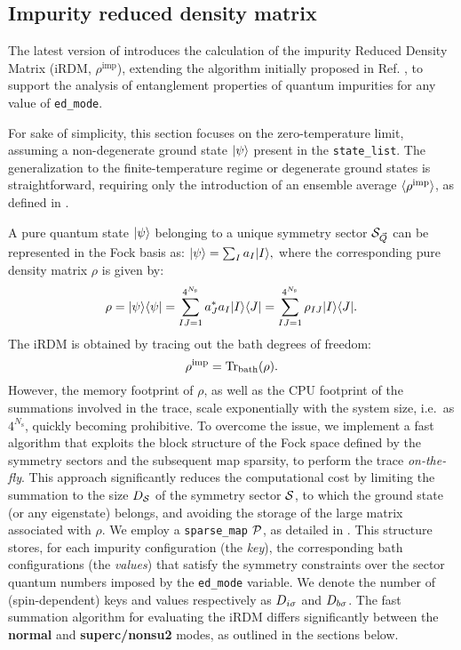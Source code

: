 \documentclass[edipack_sp.tex]{subfiles}
\begin{document}
\subsection{Impurity reduced density matrix}\label{sSecRDM}
The latest version of \NAME introduces the calculation of the 
impurity Reduced Density Matrix (iRDM, $\rho^\mathrm{imp}$), 
extending the algorithm initially proposed in 
Ref. \cite{BellomiaPhD,Bellomia2024PRB}, to support the analysis of entanglement 
properties of quantum impurities for any value of {\tt ed\_mode}.

For sake of simplicity, this section focuses on the zero-temperature limit, 
assuming a non-degenerate ground state $|\psi\rangle$ present in the 
{\tt state\_list}. The generalization to the finite-temperature regime 
or degenerate ground states is straightforward, requiring only the  introduction of an
ensemble average $\langle \rho^\mathrm{imp} \rangle$, as defined in 
.

A pure quantum state $|\psi\rangle$ belonging to a unique symmetry 
sector ${\cal S}_{\vec{Q}}$ can be represented in the Fock basis as:
$
|\psi\rangle = \sum_I a_I |I\rangle,
$
where the corresponding pure density matrix $\rho$ is given by:
\begin{equation}\label{DefRho}
\rho = |\psi\rangle\langle \psi| = \sum_{IJ=1}^{4^{N_\mathrm{s}}} 
a^*_J a_I |I\rangle\langle J| = \sum_{IJ=1}^{4^{N_\mathrm{s}}} 
\rho_{IJ} |I\rangle\langle J|.
\end{equation}
The iRDM is obtained by tracing out the bath degrees of freedom:
\begin{equation}
\rho^\mathrm{imp} = {\rm Tr}_\mathrm{bath}(\rho).
\end{equation}
However, the memory footprint of $\rho$, as well as the CPU footprint 
of the summations involved in the trace, scale exponentially 
with the system size, i.e.~as $4^{N_\mathrm{s}}$, quickly becoming prohibitive.
To overcome the issue, we implement a fast algorithm that exploits the 
block structure of the Fock space defined by the symmetry sectors and
the subsequent map sparsity, to perform the trace {\it on-the-fly}. 
This approach significantly reduces the computational cost by limiting 
the summation to the size $D_{\cal S}$ of the symmetry sector 
${\cal S}$, to which the ground state (or any eigenstate) belongs, and avoiding
the storage of the large matrix associated with $\rho$.
We employ a 
{\tt sparse\_map} ${\cal P}$, as detailed in . 
This structure stores, for each impurity configuration 
(the {\it key}), the 
corresponding bath configurations 
(the {\it values}) that 
satisfy the symmetry constraints over the sector quantum numbers
imposed by the {\tt ed\_mode} variable.
We denote the number of (spin-dependent) keys and values respectively
as ${D}_{i\sigma}$ and ${D}_{b\sigma}$.
The fast summation algorithm for evaluating the iRDM differs 
significantly between the {\bf normal} and {\bf superc/nonsu2} modes, 
as outlined in the sections below.
\end{document}
